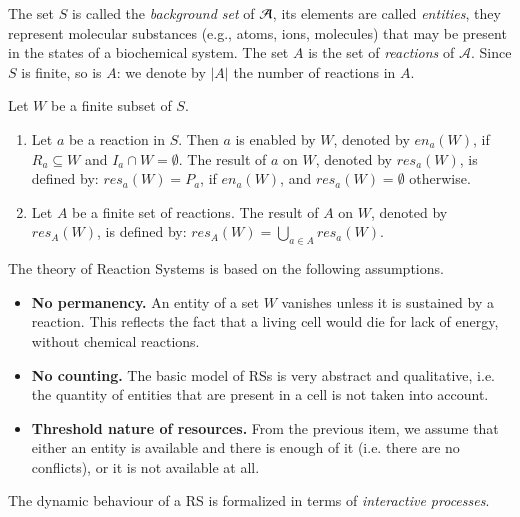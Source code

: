 The set $S$ is called the \emph{background set} of ${\cal A}$, its elements are called \emph{entities},
they represent molecular substances (e.g., atoms, ions, molecules) that may be present
in the states of a biochemical system.
The set $A$ is the set of \emph{reactions} of $\mathcal{A}$.
Since $S$ is finite, so is $A$: 
we denote by $|A|$ the number of reactions in $A$.

\begin{definition}
Let $W$ be a finite subset of $S$.
\begin{enumerate}
\item Let $a$ be a reaction in $S$. Then $a$ is enabled by $W$, denoted by $\mathit{en}_a(W)$, 
if $R_a \subseteq W$
and $I_a \cap W = \emptyset$. The result of $a$ on $W$, denoted by $\mathit{res}_a(W)$, 
is defined by:
$\mathit{res}_a(W) =P_a$, if $\mathit{en}_a(W)$, and $\mathit{res}_a(W) = \emptyset$ otherwise.
\item Let $A$ be a finite set of reactions. The result of $A$ on $W$, denoted 
by $\mathit{res}_A(W)$,  is defined
by: $\mathit{res}_A(W) = \bigcup_{a \in A} \mathit{res}_a(W)$.
\end{enumerate}
\end{definition}


The theory of Reaction Systems is based on the following assumptions.
\begin{itemize}
\item {\bf No permanency.} An entity of a set $W$ vanishes unless it is sustained 
by a reaction. This reflects the fact that a living cell would die for lack 
of energy, without chemical reactions.
\item {\bf No counting.} The basic model of RSs is very abstract and 
qualitative, i.e. the quantity of entities that are present 
in a cell is not taken into account. 
\item {\bf Threshold nature of resources.} From the 
previous item,
we assume that either an entity is available and there is enough of it 
(i.e. there are no conflicts), or it is not available at all.
\end{itemize}




The dynamic behaviour of a RS is formalized in terms of 
{\em interactive processes}.


